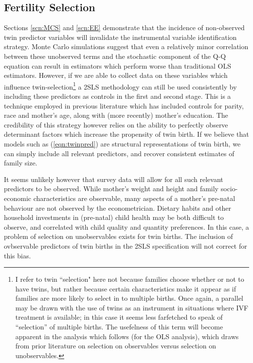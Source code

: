\documentclass{article}[11pt,subeqn]
\begin{document}
\begin{spacing}{1.25}
\subsection{Fertility Selection}
\label{scn:selection}
Sections \ref{scn:MCS} and \ref{scn:EE} demonstrate that the incidence of non-observed twin predictor variables will invalidate the instrumental variable identification strategy.  Monte Carlo simulations suggest that even a relatively minor correlation between these unobserved terms and the stochastic component of the Q-Q equation can result in estimators which perform worse than traditional OLS estimators.  However, if we are able to collect data on these variables which influence twin-selection\footnote{I refer to twin ``selection" here not because families choose whether or not to have twins, but rather because certain characteristics make it appear as if families are more likely to select in to multiple births.  Once again, a parallel may be drawn with the use of twins as an instrument in situations where IVF treatment is available; in this case it seems less farfetched to speak of ``selection'' of multiple births.  The usefelness of this term will become apparent in the analysis which follows (for the OLS analysis), which draws from prior literature on selection on observables versus selection on unobservables.} a 2SLS methodology can still be used consistently by including these predictors as controls in the first and second stage.  This is a technique employed in previous literature which has included controls for parity, race and mother's age, along with (more recently) mother's education.  The credibility of this strategy however relies on the ability to perfectly observe determinant factors which increase the propensity of twin birth.  If we believe that models such as (\ref{eqn:twinpred}) are structural representations of twin birth, we can simply include all relevant predictors, and recover consistent estimates of family size.

It seems unlikely however that survey data will allow for all such relevant predictors to be observed.  While mother's weight and height and family socio-economic characteristics are observable, many aspects of a mother's pre-natal behaviour are not observed by the econometrician.  Dietary habits and other household investments in (pre-natal) child health may be both difficult to observe, and correlated with child quality and quantity preferences.  In this case, a problem of selection on unobservables exists for twin births.  The inclusion of ovbservable predictors of twin births in the 2SLS specification will not correct for this bias.


\end{spacing}
\end{document}
